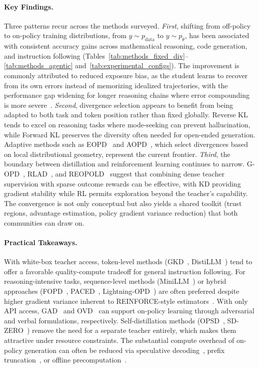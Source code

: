 \documentclass{article} %
\newcommand{\ptheta}{p_\theta}
\newcommand{\pdata}{p_{\mathrm{data}}}
\begin{document}
\paragraph{Key Findings.} Three patterns recur across the methods surveyed. \emph{First}, shifting from off-policy to on-policy training distributions, from $y \sim \pdata$ to $y \sim \ptheta$, has been associated with consistent accuracy gains across mathematical reasoning, code generation, and instruction following (Tables~\ref{tab:methods_fixed_div}--\ref{tab:methods_agentic} and~\ref{tab:experimental_configs}). The improvement is commonly attributed to reduced exposure bias, as the student learns to recover from its own errors instead of memorizing idealized trajectories, with the performance gap widening for longer reasoning chains where error compounding is more severe~\citep{2306.08543,2306.13649}. \emph{Second}, divergence selection appears to benefit from being adapted to both task and token position rather than fixed globally. Reverse KL tends to excel on reasoning tasks where mode-seeking can prevent hallucination, while Forward KL preserves the diversity often needed for open-ended generation. Adaptive methods such as EOPD~\citep{2603.07079} and AOPD~\citep{2605.06387}, which select divergences based on local distributional geometry, represent the current frontier. \emph{Third}, the boundary between distillation and reinforcement learning continues to narrow. G-OPD~\citep{2602.12125}, RLAD~\citep{2602.22495}, and REOPOLD~\citep{2603.11137} suggest that combining dense teacher supervision with sparse outcome rewards can be effective, with KD providing gradient stability while RL permits exploration beyond the teacher's capability. The convergence is not only conceptual but also yields a shared toolkit (trust regions, advantage estimation, policy gradient variance reduction) that both communities can draw on.

\paragraph{Practical Takeaways.} With white-box teacher access, token-level methods (GKD~\citep{2306.13649}, DistiLLM~\citep{2402.03898}) tend to offer a favorable quality-compute tradeoff for general instruction following. For reasoning-intensive tasks, sequence-level methods (MiniLLM~\citep{2306.08543}) or hybrid approaches (FOPD~\citep{2602.15260}, PACED~\citep{2603.11178}, Lightning-OPD~\citep{2604.13010}) are often preferred despite higher gradient variance inherent to REINFORCE-style estimators~\citep{2306.08543}. With only API access, GAD~\citep{2511.10643} and OVD~\citep{2601.21968} can support on-policy learning through adversarial and verbal formulations, respectively. Self-distillation methods (OPSD~\citep{2601.18734}, SD-ZERO~\citep{2604.12002}) remove the need for a separate teacher entirely, which makes them attractive under resource constraints. The substantial compute overhead of on-policy generation can often be reduced via speculative decoding~\citep{2410.11325}, prefix truncation~\citep{2602.15260}, or offline precomputation~\citep{2604.13010}.
\end{document}
